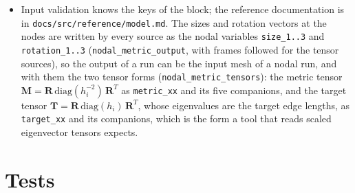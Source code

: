 \documentclass[11pt]{article}
\newcommand{\bs}[1]{\boldsymbol{#1}}
\newcommand{\code}[1]{\texttt{#1}}
\begin{document}
\begin{itemize}[itemsep=2pt]
  a split node the mean of the ends, \code{metric\_with\_node} appends it
  to the source without a copy for the evaluation of the proposal,
  \code{add\_metric\_node!} and \code{compact\_metric!} keep the nodal
  data aligned with the topology, and \code{metric\_nodal\_variables}
  writes it to the adapted mesh.
\item Input validation knows the keys of the block; the reference
  documentation is in \code{docs/src/reference/model.md}. The sizes and
  rotation vectors at the nodes are written by every source as the nodal
  variables \code{size\_1..3} and \code{rotation\_1..3}
  (\code{nodal\_metric\_output}, with frames followed for the tensor
  sources), so the output of a run can be the input mesh of a nodal run,
  and with them the two tensor forms (\code{nodal\_metric\_tensors}): the
  metric tensor $\bs M = \bs R\,\mathrm{diag}(h_i^{-2})\,\bs R^T$ as
  \code{metric\_xx} and its five companions, and the target tensor
  $\bs T = \bs R\,\mathrm{diag}(h_i)\,\bs R^T$, whose eigenvalues are the
  target edge lengths, as \code{target\_xx} and its companions, which is
  the form a tool that reads scaled eigenvector tensors expects.
\end{itemize}

\section{Tests}
\label{sec:tests}
\end{document}
